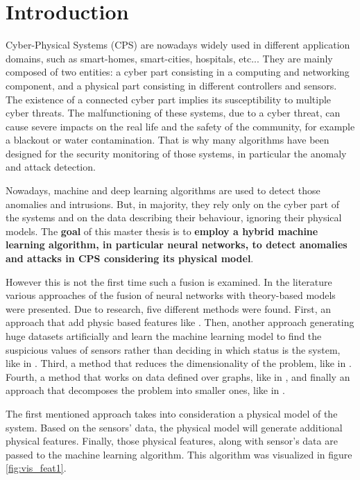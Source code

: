 \chapter*{Introduction} \label{chap:intro}

Cyber-Physical Systems (CPS) are nowadays widely used in different application domains, such as smart-homes, smart-cities, hospitals, etc... They are mainly composed of two entities: a cyber part consisting in a computing and networking component, and a physical part consisting in different controllers and sensors. The existence of a connected cyber part implies its susceptibility to multiple cyber threats. The malfunctioning of these systems, due to a cyber threat, can cause severe impacts on the real life and the safety of the community, for example a blackout or water contamination. That is why many algorithms have been designed for the security monitoring of those systems, in particular the anomaly and attack detection.

Nowadays, machine and deep learning algorithms are used to detect those anomalies and intrusions. But, in majority, they rely only on the cyber part of the systems and on the data describing their behaviour, ignoring their physical models. The \textbf{goal} of this master thesis is to \textbf{employ a hybrid machine learning algorithm, in particular neural networks, to detect anomalies and attacks in CPS considering its physical model}.

However this is not the first time such a fusion is examined. In the literature various approaches of the fusion of neural networks with theory-based models were presented. Due to research, five different methods were found. First, an approach that add physic based features like \cite{karpatne_physics-guided_2018}. Then, another approach generating huge datasets artificially and learn the machine learning model to find the suspicious values of sensors rather than deciding in which status is the system, like in \cite{ferragut_real-time_2017}. Third, a method that reduces the dimensionality of the problem, like in \cite{swischuk_projection-based_2019}. Fourth, a method that works on data defined over graphs, like in \cite{zamzam_physics-aware_2019}, and finally an approach that decomposes the problem into smaller ones, like in \cite{karpatne_theory-guided_2017}.

The first mentioned approach takes into consideration a physical model of the system. Based on the sensors' data, the physical model will generate additional physical features. Finally, those physical features, along with sensor's data are passed to the machine learning algorithm. This algorithm was visualized in figure \ref{fig:vis_feat1}.

